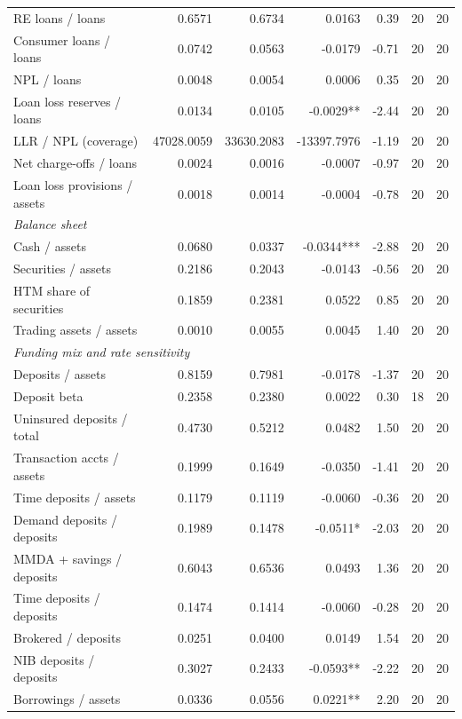 \begin{tabular}{lrrrrrr}
RE loans / loans & 0.6571 & 0.6734 & 0.0163 & 0.39 & 20 & 20 \\
Consumer loans / loans & 0.0742 & 0.0563 & -0.0179 & -0.71 & 20 & 20 \\
NPL / loans & 0.0048 & 0.0054 & 0.0006 & 0.35 & 20 & 20 \\
Loan loss reserves / loans & 0.0134 & 0.0105 & -0.0029** & -2.44 & 20 & 20 \\
LLR / NPL (coverage) & 47028.0059 & 33630.2083 & -13397.7976 & -1.19 & 20 & 20 \\
Net charge-offs / loans & 0.0024 & 0.0016 & -0.0007 & -0.97 & 20 & 20 \\
Loan loss provisions / assets & 0.0018 & 0.0014 & -0.0004 & -0.78 & 20 & 20 \\
\midrule
\multicolumn{7}{l}{\emph{Balance sheet}} \\
\midrule
Cash / assets & 0.0680 & 0.0337 & -0.0344*** & -2.88 & 20 & 20 \\
Securities / assets & 0.2186 & 0.2043 & -0.0143 & -0.56 & 20 & 20 \\
HTM share of securities & 0.1859 & 0.2381 & 0.0522 & 0.85 & 20 & 20 \\
Trading assets / assets & 0.0010 & 0.0055 & 0.0045 & 1.40 & 20 & 20 \\
\midrule
\multicolumn{7}{l}{\emph{Funding mix and rate sensitivity}} \\
\midrule
Deposits / assets & 0.8159 & 0.7981 & -0.0178 & -1.37 & 20 & 20 \\
Deposit beta & 0.2358 & 0.2380 & 0.0022 & 0.30 & 18 & 20 \\
Uninsured deposits / total & 0.4730 & 0.5212 & 0.0482 & 1.50 & 20 & 20 \\
Transaction accts / assets & 0.1999 & 0.1649 & -0.0350 & -1.41 & 20 & 20 \\
Time deposits / assets & 0.1179 & 0.1119 & -0.0060 & -0.36 & 20 & 20 \\
Demand deposits / deposits & 0.1989 & 0.1478 & -0.0511* & -2.03 & 20 & 20 \\
MMDA + savings / deposits & 0.6043 & 0.6536 & 0.0493 & 1.36 & 20 & 20 \\
Time deposits / deposits & 0.1474 & 0.1414 & -0.0060 & -0.28 & 20 & 20 \\
Brokered / deposits & 0.0251 & 0.0400 & 0.0149 & 1.54 & 20 & 20 \\
NIB deposits / deposits & 0.3027 & 0.2433 & -0.0593** & -2.22 & 20 & 20 \\
Borrowings / assets & 0.0336 & 0.0556 & 0.0221** & 2.20 & 20 & 20 \\

\end{tabular}
